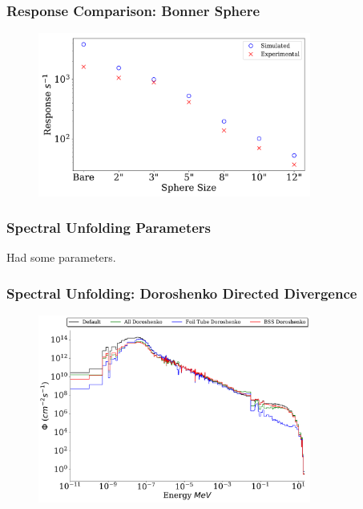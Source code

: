 \documentclass[fleqn]{beamer}
\begin{document}
\begin{frame}
\frametitle{Response Comparison: Bonner Sphere}

\begin{figure}
\centering
\includegraphics[width = 0.8\textwidth]{compare_countrates}
\caption{}
\end{figure}

\end{frame}

\begin{frame}
\frametitle{Spectral Unfolding Parameters}

Had some parameters.

\end{frame}

\begin{frame}
\frametitle{Spectral Unfolding: Doroshenko Directed Divergence}

\begin{figure}
\centering
\includegraphics[width = 0.8\textwidth]{unfolded_do}
\caption{}
\end{figure}

\end{frame}
\end{document}
